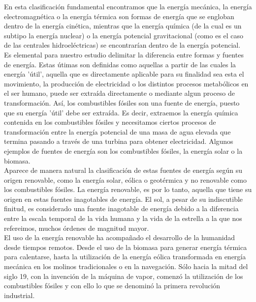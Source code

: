 En esta clasificación fundamental encontramos que la energía mecánica, la energía electromagnética o la energía térmica son formas de energía que se engloban dentro de la energía cinética, mientras que la energía química (de la cual es un subtipo la energía nuclear) o la energía potencial gravitacional (como es el caso de las centrales hidroeléctricas) se encontrarían dentro de la energía potencial.\\

Es elemental para nuestro estudio delimitar la diferencia entre formas y fuentes de energía. Estas útimas son definidas como aquellas a partir de las cuales la energía 'útil', aquella que es directamente aplicable para su finalidad sea esta el movimiento, la producción de electricidad o los distintos procesos metabólicos en el ser humano, puede ser extraída directamente o mediante algun proceso de transformación. Así, los combustibles fósiles son una fuente de energía, puesto que su energía 'útil' debe ser extraída. Es decir, extraemos la energía química contenida en los combustibles fósiles y necesitamos ciertos procesos de transformación entre la energía potencial de una masa de agua elevada que termina pasando a través de una turbina para obtener electricidad. Algunos ejemplos de fuentes de energía son los combustibles fósiles, la energía solar o la biomasa.\\  

Aparece de manera natural la clasificación de estas fuentes de energía según su origen renovable, como la energía solar, eólica o geotérmica y no renovable como los combustibles fósiles. La energía renovable, es por lo tanto, aquella que tiene su origen en estas fuentes inagotables de energía. El sol, a pesar de su indiscutible finitud,  es considerado una fuente inagotable de energía debido a la diferencia entre la escala temporal de la vida humana y la vida de la estrella a la que nos refereimos, muchos órdenes de magnitud mayor.\\

El uso de la energía renovable ha acompañado el desarrollo de la humanidad desde tiempos remotos. Desde el uso de la biomasa para generar energía térmica para calentarse, hasta la utilización de la energía eólica transformada en energía mecánica en los molinos tradicionales o en la navegación. Sólo hacia la mitad del siglo 19, con la invención de la máquina de vapor, comenzó la utilización de los combustibles fósiles y con ello lo que se denominó la primera revolución industrial.\\

